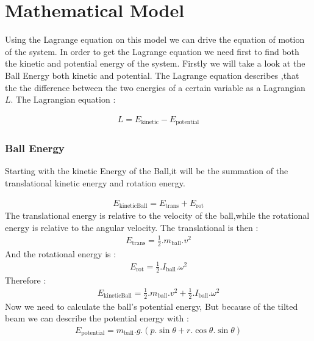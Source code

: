 \chapter{Mathematical Model}
\noindent Using the Lagrange equation on this model we can drive the equation of motion of the system.
In order to get the Lagrange equation we need first to find both the kinetic and potential energy of the system.
Firstly we will take a look at the Ball Energy both kinetic and potential.
The Lagrange equation describes ,that the the difference between the two energies of a certain variable as a Lagrangian $L$.
The Lagrangian equation :

\begin{equation}\label{Lagrangian}
	\begin{split}
		L = E_{\text{kinetic}} - E_{\text{potential}}
	\end{split}
\end{equation}
\subsection{Ball Energy}

Starting with the kinetic Energy of the Ball,it will be the summation of the translational kinetic energy and rotation energy.

\begin{equation}
	\begin{split}
		E_{\text{kineticBall}} = E_{\text{trans}} + E_{\text{rot}}
	\end{split}
\end{equation}
The translational energy is relative to the velocity of the ball,while the rotational energy is relative to the angular velocity.
The translational is then :
\begin{equation}
	\begin{split}
		E_{\text{trans}} = \frac{1}{2}.m_{\text{ball}}.v^2
	\end{split}	
\end{equation}
And the rotational energy is :
\begin{equation}
	\begin{split}
		E_{\text{rot}} = \frac{1}{2}.I_{\text{ball}}.\omega^2
	\end{split}
\end{equation}
Therefore :
\begin{equation}\label{kineticBall}
	\begin{split}
		E_{\text{kineticBall}} =\frac{1}{2}.m_{\text{ball}}.v^2 + \frac{1}{2}.I_{\text{ball}}.\omega^2
	\end{split}
\end{equation}
Now we need to calculate the ball's potential energy, 
But because of the tilted beam we can describe the potential energy with :
\begin{equation}
	\begin{split}\label{potential}
		E_{\text{potential}} = m_{\text{ball}}.g.(p.\sin{\theta} + r.\cos{\theta}.\sin{\theta})
	\end{split}
\end{equation}

